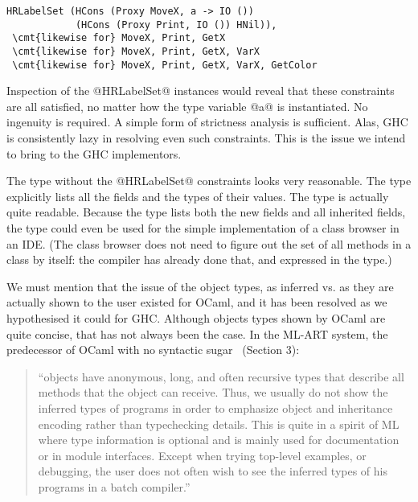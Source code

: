 \begin{Verbatim}[fontsize=\small,commandchars=\\\{\}]
 HRLabelSet (HCons (Proxy MoveX, a -> IO ())
            (HCons (Proxy Print, IO ()) HNil)),
 \cmt{likewise for} MoveX, Print, GetX
 \cmt{likewise for} MoveX, Print, GetX, VarX
 \cmt{likewise for} MoveX, Print, GetX, VarX, GetColor
\end{Verbatim}
 
Inspection of the @HRLabelSet@ instances would reveal that these
constraints are all satisfied, no matter how the type variable @a@ is
instantiated. No ingenuity is required. A simple form of strictness
analysis is sufficient. Alas, GHC is consistently lazy in resolving
even such constraints. This is the issue we intend to bring to the GHC
implementors.

The type without the @HRLabelSet@ constraints looks very
reasonable. The type explicitly lists all the fields and the types of
their values. The type is actually quite readable. Because the type
lists both the new fields and all inherited fields, the type could
even be used for the simple implementation of a class browser in an
IDE. (The class browser does not need to figure out the set of all
methods in a class by itself: the compiler has already done that, and
expressed in the type.)

We must mention that the issue of the object types, as inferred vs. as
they are actually shown to the user existed for OCaml, and it has been
resolved as we hypothesised it could for GHC. Although objects types
shown by OCaml are quite concise, that has not always been the
case. In the {ML-ART} system, the predecessor of OCaml with no
syntactic sugar~\cite{ML-ART} (Section 3):

\begin{quote}\small
``objects have anonymous, long, and often recursive
types that describe all methods that the object can receive. Thus, we
usually do not show the inferred types of programs in order to
emphasize object and inheritance encoding rather than typechecking
details. This is quite in a spirit of ML where type information is
optional and is mainly used for documentation or in module
interfaces. Except when trying top-level examples, or debugging, the
user does not often wish to see the inferred types of his programs in
a batch compiler.''
\end{quote}






